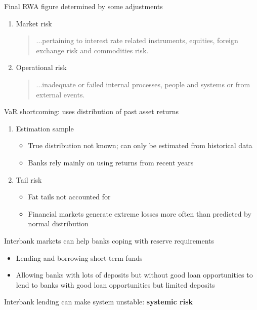 \documentclass{beamer}
\begin{document}
\begin{frame}
  Final RWA figure determined by some adjustments
  \begin{enumerate}
    \item Market risk
    \begin{quote}
      ...pertaining to interest rate related instruments, equities, foreign exchange risk and commodities risk.
    \end{quote}
    \item Operational risk
    \begin{quote}
      ...inadequate or failed internal processes, people and systems or from external events.
    \end{quote}
  \end{enumerate}
\end{frame}

\begin{frame}
 VaR shortcoming: uses distribution of past asset returns 
\begin{enumerate}
  \item Estimation sample
  \begin{itemize}
    \item True distribution not known; can only be estimated from historical data
    \item Banks rely mainly on using returns from recent years
  \end{itemize}
  \medskip
  \item Tail risk
  \begin{itemize}
    \item Fat tails not accounted for
    \item Financial markets generate extreme losses more often than predicted by normal distribution    
  \end{itemize}
\end{enumerate}
\end{frame}

\begin{frame}
  Interbank markets can help banks coping with reserve requirements
\begin{itemize}
  \item Lending and borrowing short-term funds
  \item Allowing banks with lots of deposits but without good loan opportunities to lend to banks with good loan opportunities but limited deposits
\end{itemize}
\medskip
Interbank lending can make system unstable: \textbf{systemic risk}
\end{frame}
\end{document}
